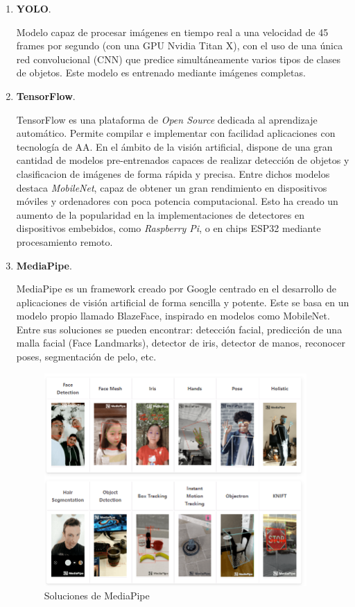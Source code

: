 \begin{enumerate}
	\item \textbf{YOLO}.
	
	Modelo capaz de procesar imágenes en tiempo real a una velocidad de 45 frames por segundo (con una GPU Nvidia Titan X), con el uso de una única red convolucional (CNN) que predice simultáneamente varios tipos de clases de objetos. Este modelo es entrenado mediante imágenes completas.\cite{YOLO}
	
	\item \textbf{TensorFlow}.
	
	TensorFlow es una plataforma de \textit{Open Source} dedicada al aprendizaje automático. Permite compilar e implementar con facilidad aplicaciones con tecnología de AA. En el ámbito de la visión artificial, dispone de una gran cantidad de modelos pre-entrenados capaces de realizar detección de objetos y clasificacion de imágenes de forma rápida y precisa. Entre dichos modelos destaca \textit{MobileNet}, capaz de obtener un gran rendimiento en dispositivos móviles y ordenadores con poca potencia computacional. Esto ha creado un aumento de la popularidad en la implementaciones de detectores en dispositivos embebidos, como \textit{Raspberry Pi}, o en chips ESP32 mediante procesamiento remoto.
	
	\item \textbf{MediaPipe}.
	
	MediaPipe es un framework creado por Google centrado en el desarrollo de aplicaciones de visión artificial de forma sencilla y potente. Este se basa en un modelo propio llamado BlazeFace, inspirado en modelos como MobileNet. Entre sus soluciones se pueden encontrar: detección facial, predicción de una malla facial (Face Landmarks), detector de iris, detector de manos, reconocer poses, segmentación de pelo, etc.
	
	\begin{figure}[htp]
		\centering
		\includegraphics[width=10cm]{imagenes/solucionesMediaPipe.png}
		\caption{Soluciones de MediaPipe}
		\label{fig:solMed}
	\end{figure}
	

\end{enumerate}
